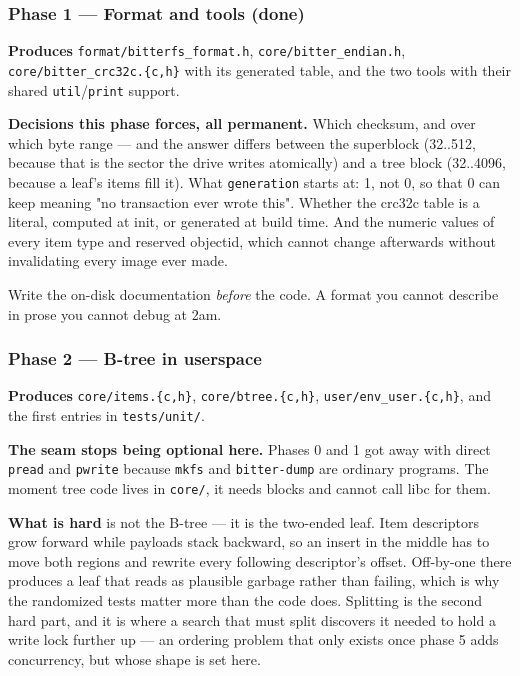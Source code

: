 \subsubsection{Phase 1 --- Format and tools \textnormal{(done)}}

\textbf{Produces} \texttt{format/bitterfs\_format.h},
\texttt{core/bitter\_endian.h}, \texttt{core/bitter\_crc32c.\{c,h\}} with its
generated table, and the two tools with their shared \texttt{util}/\texttt{print}
support.

\textbf{Decisions this phase forces, all permanent.} Which checksum, and over
which byte range --- and the answer differs between the superblock (32..512,
because that is the sector the drive writes atomically) and a tree block
(32..4096, because a leaf's items fill it). What \texttt{generation} starts at:
1, not 0, so that 0 can keep meaning "no transaction ever wrote this". Whether
the crc32c table is a literal, computed at init, or generated at build time.
And the numeric values of every item type and reserved objectid, which cannot
change afterwards without invalidating every image ever made.

Write the on-disk documentation \emph{before} the code. A format you cannot
describe in prose you cannot debug at 2am.

\subsubsection{Phase 2 --- B-tree in userspace}

\textbf{Produces} \texttt{core/items.\{c,h\}}, \texttt{core/btree.\{c,h\}},
\texttt{user/env\_user.\{c,h\}}, and the first entries in \texttt{tests/unit/}.

\textbf{The seam stops being optional here.} Phases 0 and 1 got away with
direct \texttt{pread} and \texttt{pwrite} because \texttt{mkfs} and
\texttt{bitter-dump} are ordinary programs. The moment tree code lives in
\texttt{core/}, it needs blocks and cannot call libc for them.

\textbf{What is hard} is not the B-tree --- it is the two-ended leaf. Item
descriptors grow forward while payloads stack backward, so an insert in the
middle has to move both regions and rewrite every following descriptor's
offset. Off-by-one there produces a leaf that reads as plausible garbage rather
than failing, which is why the randomized tests matter more than the code does.
Splitting is the second hard part, and it is where a search that must split
discovers it needed to hold a write lock further up --- an ordering problem
that only exists once phase 5 adds concurrency, but whose shape is set here.

